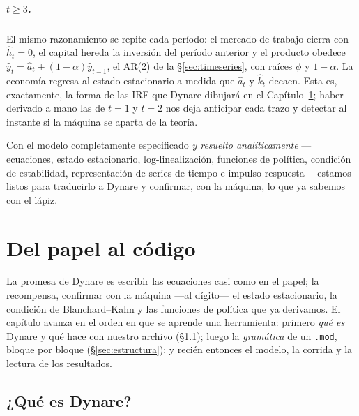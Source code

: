 \documentclass[11pt,a4paper]{report}
\newcommand{\code}[1]{\texttt{#1}}
\begin{document}
\paragraph{$t\ge3$.} El mismo razonamiento se repite cada período: el mercado de
trabajo cierra con $\hat{h}_t=0$, el capital hereda la inversión del período anterior
y el producto obedece $\hat{y}_t=\hat{a}_t+(1-\alpha)\hat{y}_{t-1}$, el AR(2) de la
\S\ref{sec:timeseries}, con raíces $\phi$ y $1-\alpha$. La economía regresa al estado
estacionario a medida que $\hat{a}_t$ y $\hat{k}_t$ decaen. Esta es, exactamente, la
forma de las IRF que Dynare dibujará en el Capítulo~\ref{ch:codigo}; haber derivado a
mano las de $t=1$ y $t=2$ nos deja anticipar cada trazo y detectar al instante si la
máquina se aparta de la teoría.

Con el modelo completamente especificado \emph{y resuelto analíticamente}
---ecuaciones, estado estacionario, log-linealización, funciones de política,
condición de estabilidad, representación de series de tiempo e impulso-respuesta---
estamos listos para traducirlo a Dynare y confirmar, con la máquina, lo que ya sabemos
con el lápiz.

\chapter{Del papel al código}
\label{ch:codigo}

La promesa de Dynare es escribir las ecuaciones casi como en el papel; la
recompensa, confirmar con la máquina ---al dígito--- el estado estacionario, la
condición de Blanchard--Kahn y las funciones de política que ya derivamos. El
capítulo avanza en el orden en que se aprende una herramienta: primero \emph{qué es}
Dynare y qué hace con nuestro archivo (\S\ref{sec:quedynare}); luego la
\emph{gramática} de un \code{.mod}, bloque por bloque (\S\ref{sec:estructura}); y
recién entonces el modelo, la corrida y la lectura de los resultados.

\section{¿Qué es Dynare?}
\label{sec:quedynare}
\end{document}
